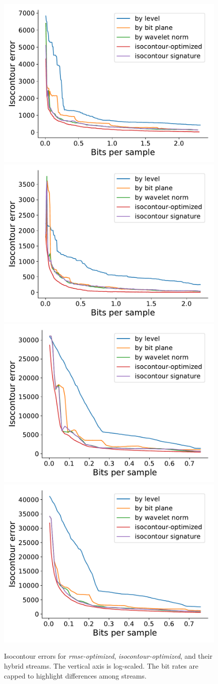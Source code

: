 \begin{figure}
	\centering
	{\includegraphics[width=0.48\linewidth]{img/isocontour/isocontour-optimized-boiler.pdf}}
	{\includegraphics[width=0.48\linewidth]{img/isocontour/isocontour-optimized-turbulence.pdf}}
	{\includegraphics[width=0.48\linewidth]{img/isocontour/isocontour-optimized-velocityz.pdf}}
	{\includegraphics[width=0.48\linewidth]{img/isocontour/isocontour-optimized-diffusivity.pdf}}
	\caption{Isocontour errors for \emph{rmse-optimized}, \emph{isocontour-optimized}, and their
	hybrid streams. The vertical axis is log-scaled. The bit rates are capped to highlight differences
	among streams.}
	\label{fig:isocontour-plots}
\end{figure}

